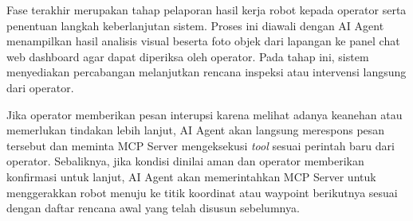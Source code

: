 Fase terakhir merupakan tahap pelaporan hasil kerja robot kepada operator serta penentuan langkah keberlanjutan sistem. Proses ini diawali dengan AI Agent menampilkan hasil analisis visual beserta foto objek dari lapangan ke panel chat web dashboard agar dapat diperiksa oleh operator. Pada tahap ini, sistem menyediakan percabangan melanjutkan rencana inspeksi atau intervensi langsung dari operator. 

Jika operator memberikan pesan interupsi karena melihat adanya keanehan atau memerlukan tindakan lebih lanjut, AI Agent akan langsung merespons pesan tersebut dan meminta MCP Server mengeksekusi \textit{tool} sesuai perintah baru dari operator. Sebaliknya, jika kondisi dinilai aman dan operator memberikan konfirmasi untuk lanjut, AI Agent akan memerintahkan MCP Server untuk menggerakkan robot menuju ke titik koordinat atau waypoint berikutnya sesuai dengan daftar rencana awal yang telah disusun sebelumnya.




